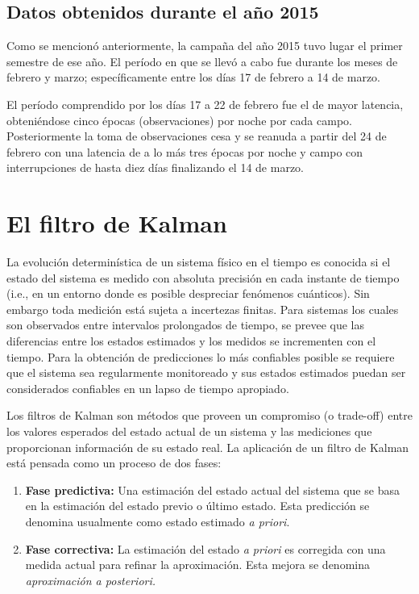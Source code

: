 \subsection{Datos obtenidos durante el a\~no 2015}
Como se mencion\'o anteriormente, la campa\~na del a\~no 2015 tuvo lugar el primer semestre de ese a\~no. El per\'iodo en que se llev\'o a cabo fue durante los meses de febrero y marzo; espec\'ificamente entre los d\'ias 17 de febrero a 14 de marzo.
\bigskip

El per\'iodo comprendido por los d\'ias 17 a 22 de febrero fue el de mayor latencia, obteni\'endose cinco \'epocas (observaciones) por noche por cada campo. Posteriormente la toma de observaciones cesa y se reanuda a partir del 24 de febrero con una latencia de a lo m\'as tres \'epocas por noche y campo con interrupciones de hasta diez d\'ias finalizando el 14 de marzo.

\section{El filtro de Kalman}
La evoluci\'on determin\'istica de un sistema f\'isico en el tiempo es conocida si el estado del sistema es medido con absoluta precisi\'on en cada instante de tiempo (i.e., en un entorno donde es posible despreciar fen\'omenos cu\'anticos). Sin embargo toda medici\'on est\'a sujeta a incertezas finitas. Para sistemas los cuales son observados entre intervalos prolongados de tiempo, se prevee que las diferencias entre los estados estimados y los medidos se incrementen con el tiempo. Para la obtenci\'on de predicciones lo m\'as confiables posible se requiere que el sistema sea regularmente monitoreado y sus estados estimados puedan ser considerados confiables en un lapso de tiempo apropiado. 
\bigskip

Los filtros de Kalman son m\'etodos que proveen un compromiso (o trade-off) entre los valores esperados del estado actual de un sistema y las mediciones que proporcionan informaci\'on de su estado real. La aplicaci\'on de un filtro de Kalman est\'a pensada como un proceso de dos fases:
\begin{enumerate}
\item \textbf{Fase predictiva:} Una estimaci\'on del estado actual del sistema que se basa en la estimaci\'on del estado previo o \'ultimo estado. Esta predicci\'on se denomina usualmente como estado estimado \textit{a priori}. 
\item \textbf{Fase correctiva:} La estimaci\'on del estado \textit{a priori} es corregida con una medida actual para refinar la aproximaci\'on. Esta mejora se denomina \textit{aproximaci\'on a posteriori.}
\end{enumerate}

